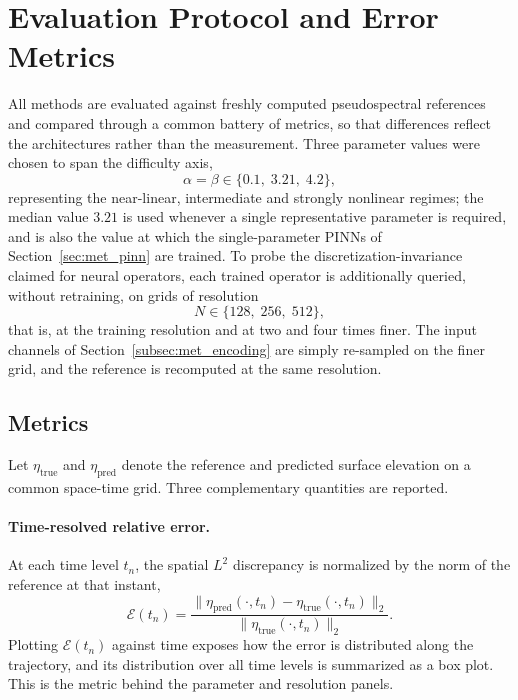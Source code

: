 \section{Evaluation Protocol and Error Metrics}
\label{sec:met_metrics}

All methods are evaluated against freshly computed pseudospectral references and compared through a common battery of metrics, so that differences reflect the architectures rather than the measurement. Three parameter values were chosen to span the difficulty axis,
\begin{equation}\label{eq:eval_params}
    \alpha = \beta \in \{0.1,\; 3.21,\; 4.2\},
\end{equation}
representing the near-linear, intermediate and strongly nonlinear regimes; the median value $3.21$ is used whenever a single representative parameter is required, and is also the value at which the single-parameter PINNs of Section~\ref{sec:met_pinn} are trained. To probe the discretization-invariance claimed for neural operators, each trained operator is additionally queried, without retraining, on grids of resolution
\begin{equation}\label{eq:eval_res}
    N \in \{128,\; 256,\; 512\},
\end{equation}
that is, at the training resolution and at two and four times finer. The input channels of Section~\ref{subsec:met_encoding} are simply re-sampled on the finer grid, and the reference is recomputed at the same resolution.

\subsection{Metrics}
\label{subsec:met_defs}

Let $\eta_{\text{true}}$ and $\eta_{\text{pred}}$ denote the reference and predicted surface elevation on a common space-time grid. Three complementary quantities are reported.

\paragraph{Time-resolved relative error.} At each time level $t_n$, the spatial $L^2$ discrepancy is normalized by the norm of the reference at that instant,
\begin{equation}\label{eq:rel_time}
    \mathcal{E}(t_n) = \frac{\bigl\| \eta_{\text{pred}}(\cdot, t_n) - \eta_{\text{true}}(\cdot, t_n) \bigr\|_2}{\bigl\| \eta_{\text{true}}(\cdot, t_n) \bigr\|_2}.
\end{equation}
Plotting $\mathcal{E}(t_n)$ against time exposes how the error is distributed along the trajectory, and its distribution over all time levels is summarized as a box plot. This is the metric behind the parameter and resolution panels.

